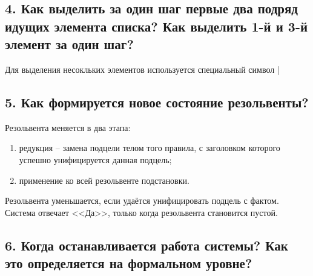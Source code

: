\subsection*{4. Как выделить за один шаг первые два подряд идущих элемента списка? Как выделить 1-й и 3-й элемент за один шаг?}

Для выделения несокльких элементов используется специальный символ |

\subsection*{5. Как формируется новое состояние резольвенты?}

Резольвента меняется в два этапа:

\begin{enumerate}
	\item редукция -- замена подцели телом того правила, с заголовком которого успешно унифицируется данная подцель;
	
	\item применение ко всей резольвенте подстановки.
\end{enumerate}

Резольвента уменьшается, если удаётся унифицировать подцель с фактом. Система отвечает <<Да>>, только когда резольвента становится пустой.

\subsection*{6. Когда останавливается работа системы? Как это определяется на формальном уровне?}
